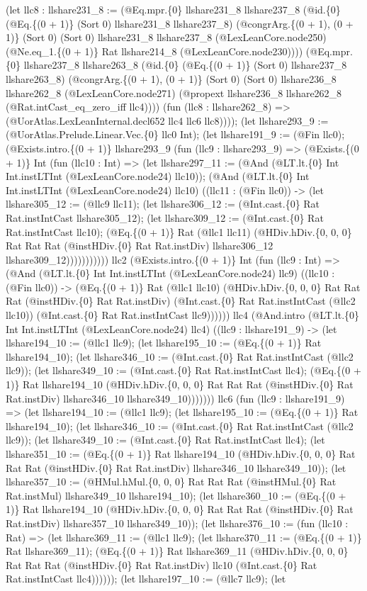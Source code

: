 \documentclass[11pt]{article}
\begin{document}
(let llc8 : llshare231\_8 := (@Eq.mpr.\{0\} llshare231\_8 llshare237\_8 (@id.\{0\} (@Eq.\{(0 + 1)\} (Sort 0) llshare231\_8 llshare237\_8) (@congrArg.\{(0 + 1), (0 + 1)\} (Sort 0) (Sort 0) llshare231\_8 llshare237\_8 (@LexLeanCore.node250) (@Ne.eq\_1.\{(0 + 1)\} Rat llshare214\_8 (@LexLeanCore.node230)))) (@Eq.mpr.\{0\} llshare237\_8 llshare263\_8 (@id.\{0\} (@Eq.\{(0 + 1)\} (Sort 0) llshare237\_8 llshare263\_8) (@congrArg.\{(0 + 1), (0 + 1)\} (Sort 0) (Sort 0) llshare236\_8 llshare262\_8 (@LexLeanCore.node271) (@propext llshare236\_8 llshare262\_8 (@Rat.intCast\_eq\_zero\_iff llc4)))) (fun (llc8 : llshare262\_8) => (@UorAtlas.LexLeanInternal.decl652 llc4 llc6 llc8)))); (let llshare293\_9 := (@UorAtlas.Prelude.Linear.Vec.\{0\} llc0 Int); (let llshare191\_9 := (@Fin llc0); (@Exists.intro.\{(0 + 1)\} llshare293\_9 (fun (llc9 : llshare293\_9) => (@Exists.\{(0 + 1)\} Int (fun (llc10 : Int) => (let llshare297\_11 := (@And (@LT.lt.\{0\} Int Int.instLTInt (@LexLeanCore.node24) llc10)); (@And (@LT.lt.\{0\} Int Int.instLTInt (@LexLeanCore.node24) llc10) ((llc11 : (@Fin llc0)) -> (let llshare305\_12 := (@llc9 llc11); (let llshare306\_12 := (@Int.cast.\{0\} Rat Rat.instIntCast llshare305\_12); (let llshare309\_12 := (@Int.cast.\{0\} Rat Rat.instIntCast llc10); (@Eq.\{(0 + 1)\} Rat (@llc1 llc11) (@HDiv.hDiv.\{0, 0, 0\} Rat Rat Rat (@instHDiv.\{0\} Rat Rat.instDiv) llshare306\_12 llshare309\_12))))))))))) llc2 (@Exists.intro.\{(0 + 1)\} Int (fun (llc9 : Int) => (@And (@LT.lt.\{0\} Int Int.instLTInt (@LexLeanCore.node24) llc9) ((llc10 : (@Fin llc0)) -> (@Eq.\{(0 + 1)\} Rat (@llc1 llc10) (@HDiv.hDiv.\{0, 0, 0\} Rat Rat Rat (@instHDiv.\{0\} Rat Rat.instDiv) (@Int.cast.\{0\} Rat Rat.instIntCast (@llc2 llc10)) (@Int.cast.\{0\} Rat Rat.instIntCast llc9)))))) llc4 (@And.intro (@LT.lt.\{0\} Int Int.instLTInt (@LexLeanCore.node24) llc4) ((llc9 : llshare191\_9) -> (let llshare194\_10 := (@llc1 llc9); (let llshare195\_10 := (@Eq.\{(0 + 1)\} Rat llshare194\_10); (let llshare346\_10 := (@Int.cast.\{0\} Rat Rat.instIntCast (@llc2 llc9)); (let llshare349\_10 := (@Int.cast.\{0\} Rat Rat.instIntCast llc4); (@Eq.\{(0 + 1)\} Rat llshare194\_10 (@HDiv.hDiv.\{0, 0, 0\} Rat Rat Rat (@instHDiv.\{0\} Rat Rat.instDiv) llshare346\_10 llshare349\_10))))))) llc6 (fun (llc9 : llshare191\_9) => (let llshare194\_10 := (@llc1 llc9); (let llshare195\_10 := (@Eq.\{(0 + 1)\} Rat llshare194\_10); (let llshare346\_10 := (@Int.cast.\{0\} Rat Rat.instIntCast (@llc2 llc9)); (let llshare349\_10 := (@Int.cast.\{0\} Rat Rat.instIntCast llc4); (let llshare351\_10 := (@Eq.\{(0 + 1)\} Rat llshare194\_10 (@HDiv.hDiv.\{0, 0, 0\} Rat Rat Rat (@instHDiv.\{0\} Rat Rat.instDiv) llshare346\_10 llshare349\_10)); (let llshare357\_10 := (@HMul.hMul.\{0, 0, 0\} Rat Rat Rat (@instHMul.\{0\} Rat Rat.instMul) llshare349\_10 llshare194\_10); (let llshare360\_10 := (@Eq.\{(0 + 1)\} Rat llshare194\_10 (@HDiv.hDiv.\{0, 0, 0\} Rat Rat Rat (@instHDiv.\{0\} Rat Rat.instDiv) llshare357\_10 llshare349\_10)); (let llshare376\_10 := (fun (llc10 : Rat) => (let llshare369\_11 := (@llc1 llc9); (let llshare370\_11 := (@Eq.\{(0 + 1)\} Rat llshare369\_11); (@Eq.\{(0 + 1)\} Rat llshare369\_11 (@HDiv.hDiv.\{0, 0, 0\} Rat Rat Rat (@instHDiv.\{0\} Rat Rat.instDiv) llc10 (@Int.cast.\{0\} Rat Rat.instIntCast llc4)))))); (let llshare197\_10 := (@llc7 llc9); (let 
\end{document}
